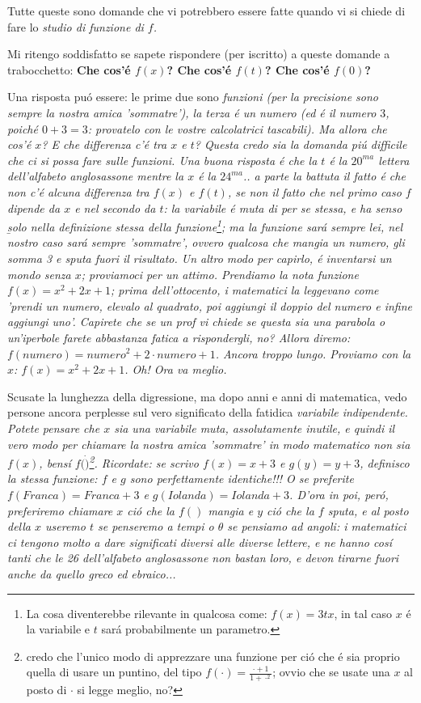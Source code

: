 Tutte queste sono domande che vi potrebbero essere fatte quando vi si chiede di fare lo \em{studio di funzione} di $f$. 

Mi ritengo soddisfatto se sapete rispondere (per iscritto) a queste domande a trabocchetto: {\bf Che cos'\'e $f(x)$? Che cos'\'e $f(t)$? Che cos'\'e $f(0)$?}  

Una risposta pu\'o essere: le prime due sono \em{funzioni} (per la precisione sono sempre la nostra amica 'sommatre'), la terza \'e un \em{numero} (ed \'e il numero $3$, poich\'e $0+3=3$:
provatelo con le vostre calcolatrici tascabili). Ma allora che cos'\'e $x$? E che differenza c'\'e tra $x$ e $t$? Questa credo sia la domanda pi\'u difficile che ci si possa fare sulle
funzioni. Una buona risposta \'e che la $t$ \'e la $20^{ma}$ lettera dell'alfabeto anglosassone mentre la $x$ \'e la $24^{ma}$.. a parte la battuta il fatto \'e che non c'\'e alcuna differenza
tra $f(x)$ e $f(t)$, se non il fatto che nel primo caso $f$ dipende da $x$ e nel secondo da $t$: la variabile \'e muta di per se stessa,
e ha senso \b{solo} nella definizione stessa della funzione\footnote{La cosa diventerebbe rilevante in qualcosa
come: $f(x)=3tx$, in tal caso $x$ \'e la variabile e $t$ sar\'a probabilmente un parametro.}; ma la funzione sar\'a
sempre lei, nel nostro caso sar\'a sempre 'sommatre', ovvero qualcosa che mangia un numero, gli somma 3 e sputa fuori
il risultato. Un altro modo per capirlo, \'e inventarsi un mondo senza $x$; proviamoci per un attimo. Prendiamo la nota
funzione $f(x)=x^2+2x+1$; prima dell'ottocento, i matematici la leggevano come 'prendi un numero, elevalo al quadrato,
poi aggiungi il doppio del numero e infine aggiungi uno'. Capirete che se un prof vi chiede se questa sia una parabola
o un'iperbole farete abbastanza fatica a rispondergli, no? Allora diremo: $f(numero)=numero^2+2 \cdot numero+1$.
Ancora troppo lungo. Proviamo con la $x$: $f(x)=x^2+2x+1$. Oh! Ora va meglio.

Scusate la lunghezza della digressione, ma dopo anni e anni di matematica, vedo persone ancora perplesse sul vero
significato della fatidica \em{variabile indipendente}. Potete pensare che $x$ sia una variabile \em{muta},
assolutamente inutile, e quindi il vero modo per chiamare la nostra amica 'sommatre' in modo matematico non sia $f(x)$,
bens\'i $f(\dot)$\footnote{credo che l'unico modo di apprezzare una funzione per ci\'o che \'e sia proprio quella di
usare un puntino, del tipo $f(\cdot)=\frac{\cdot+1}{1+\cdot^2}$; ovvio che se usate una $x$ al posto di $\cdot$ si legge
meglio, no?}. Ricordate: se scrivo $f(x)=x+3$ e $g(y)=y+3$, definisco la stessa funzione: $f$ e $g$
sono {\em perfettamente identiche}!!! O se preferite $f(Franca)=Franca+3$ e $g(Iolanda)=Iolanda+3$.
D'ora in poi, per\'o, preferiremo chiamare $x$ ci\'o che la $f()$ mangia e $y$ ci\'o che la $f$ sputa,
e al posto della $x$ useremo $t$ se penseremo a tempi o $\theta$ se pensiamo ad angoli: i matematici ci
tengono molto a dare significati diversi alle diverse lettere, e ne hanno cos\'i tanti che le 26 dell'alfabeto
anglosassone non bastan loro, e devon tirarne fuori anche da quello greco ed ebraico...

